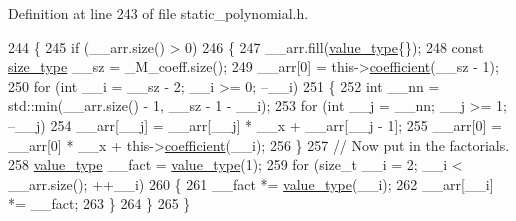 Definition at line 243 of file static\+\_\+polynomial.\+h.


\begin{DoxyCode}
244         \{
245           \textcolor{keywordflow}{if} (\_\_arr.size() > 0)
246             \{
247               \_\_arr.fill(\hyperlink{class____gnu__cxx_1_1__StaticPolynomial_aad5f3d6d5876b6926b30724aeac649d6}{value\_type}\{\});
248               \textcolor{keyword}{const} \hyperlink{class____gnu__cxx_1_1__StaticPolynomial_a0cc0aa4adab35686ef2474e07f511ff9}{size\_type} \_\_sz = \_M\_coeff.size();
249               \_\_arr[0] = this->\hyperlink{class____gnu__cxx_1_1__StaticPolynomial_a74535a3f8f586223097b30891bc1402b}{coefficient}(\_\_sz - 1);
250               \textcolor{keywordflow}{for} (\textcolor{keywordtype}{int} \_\_i = \_\_sz - 2; \_\_i >= 0; --\_\_i)
251                 \{
252                   \textcolor{keywordtype}{int} \_\_nn = std::min(\_\_arr.size() - 1, \_\_sz - 1 - \_\_i);
253                   \textcolor{keywordflow}{for} (\textcolor{keywordtype}{int} \_\_j = \_\_nn; \_\_j >= 1; --\_\_j)
254                     \_\_arr[\_\_j] = \_\_arr[\_\_j] * \_\_x + \_\_arr[\_\_j - 1];
255                   \_\_arr[0] = \_\_arr[0] * \_\_x + this->\hyperlink{class____gnu__cxx_1_1__StaticPolynomial_a74535a3f8f586223097b30891bc1402b}{coefficient}(\_\_i);
256                 \}
257               \textcolor{comment}{//  Now put in the factorials.}
258               \hyperlink{class____gnu__cxx_1_1__StaticPolynomial_aad5f3d6d5876b6926b30724aeac649d6}{value\_type} \_\_fact = \hyperlink{class____gnu__cxx_1_1__StaticPolynomial_aad5f3d6d5876b6926b30724aeac649d6}{value\_type}(1);
259               \textcolor{keywordflow}{for} (\textcolor{keywordtype}{size\_t} \_\_i = 2; \_\_i < \_\_arr.size(); ++\_\_i)
260                 \{
261                   \_\_fact *= \hyperlink{class____gnu__cxx_1_1__StaticPolynomial_aad5f3d6d5876b6926b30724aeac649d6}{value\_type}(\_\_i);
262                   \_\_arr[\_\_i] *= \_\_fact;
263                 \}
264             \}
265         \}
\end{DoxyCode}
\mbox{\label{class____gnu__cxx_1_1__StaticPolynomial_abab76d3791fb3575b30f69593da68ca9}} 
